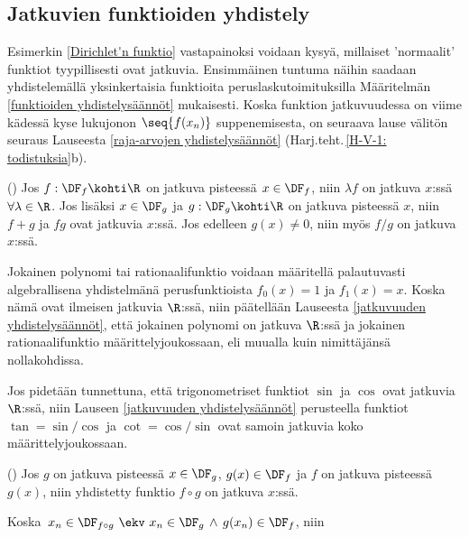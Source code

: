 \subsection*{Jatkuvien funktioiden yhdistely}

Esimerkin \ref{Dirichlet'n funktio} vastapainoksi voidaan kysyä, millaiset 'normaalit' funktiot 
tyypillisesti ovat jatkuvia. Ensimmäinen tuntuma näihin saadaan yhdistelemällä yksinkertaisia 
funktioita peruslaskutoimituksilla Määritelmän \ref{funktioiden yhdistelysäännöt} mukaisesti.
Koska funktion jatkuvuudessa on viime kädessä kyse lukujonon $\seq{f(x_n)}$ suppenemisesta,
on seuraava lause välitön seuraus Lauseesta \ref{raja-arvojen yhdistelysäännöt}
(Harj.teht.\,\ref{H-V-1: todistuksia}b).
\begin{Lause} () \label{jatkuvuuden yhdistelysäännöt}
Jos $f:\DF_f\kohti\R$ on jatkuva pisteessä $x\in\DF_f$, niin $\lambda f$ on jatkuva $x$:ssä 
$\forall\lambda\in\R$. Jos lisäksi $x\in\DF_g$ ja $g:\DF_g\kohti\R$ on jatkuva pisteessä $x$,
niin $f+g$ ja $fg$ ovat jatkuvia $x$:ssä. Jos edelleen $g(x)\neq 0$, niin myös $f/g$ on
jatkuva $x$:ssä.
\end{Lause}
\begin{Exa} Jokainen polynomi tai rationaalifunktio voidaan määritellä palautuvasti
algebrallisena yhdistelmänä perusfunktioista $f_0(x)=1$ ja $f_1(x)=x$. Koska nämä ovat
ilmeisen jatkuvia $\R$:ssä, niin päätellään Lauseesta \ref{jatkuvuuden yhdistelysäännöt},
että jokainen polynomi on jatkuva $\R$:ssä ja jokainen rationaalifunktio
määrittelyjoukossaan, eli muualla kuin nimittäjänsä nollakohdissa. \loppu 
\end{Exa}
\begin{Exa} \label{trig yhdistely} Jos pidetään tunnettuna, että trigonometriset funktiot
$\sin$ ja $\cos$ ovat jatkuvia $\R$:ssä, niin Lauseen \ref{jatkuvuuden yhdistelysäännöt}
perusteella funktiot $\tan=\sin/\cos$ ja $\cot=\cos/\sin$ ovat samoin jatkuvia koko
määrittelyjoukossaan. \loppu 
\end{Exa}
\begin{Lause} () \label{yhdistetyn funktion jatkuvuus}
Jos $g$ on jatkuva pisteessä $x\in\DF_g$, $g(x)\in\DF_f$ ja $f$ on jatkuva pisteessä $g(x)$,
niin yhdistetty funktio $f\circ g$ on jatkuva $x$:ssä.
\end{Lause}
\tod Koska $\,x_n\in\DF_{f \circ g}\ \ekv\ x_n\in\DF_g\,\wedge\,g(x_n)\in\DF_f$, niin
